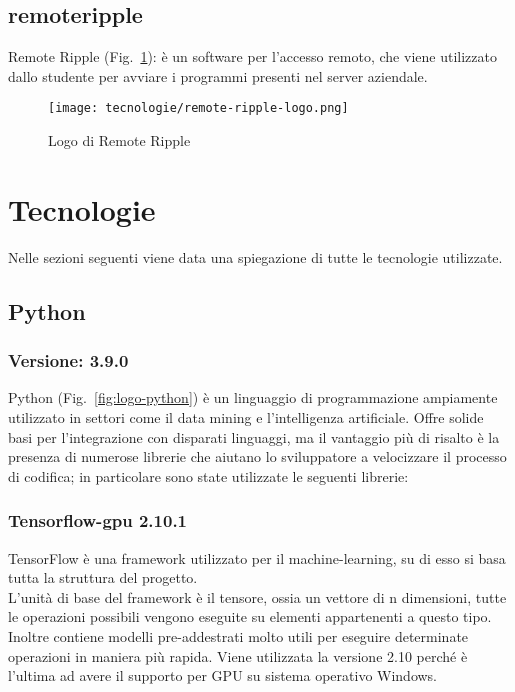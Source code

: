 \subsection{remoteripple}
Remote Ripple (Fig.~\ref{fig:logo-remoteripple}): è un software per l'accesso remoto, che viene utilizzato dallo studente per avviare i programmi presenti nel server aziendale.
    
\begin{figure}[!h] 
    \centering 
    \texttt{[image: tecnologie/remote-ripple-logo.png]} 
    \caption{Logo di Remote Ripple}
    \label{fig:logo-remoteripple}
  \end{figure}


\newpage

\section{Tecnologie}
\label{sec:tecnologie-strumenti}

Nelle sezioni seguenti viene data una spiegazione di tutte le tecnologie utilizzate.

\subsection{Python}

\subsubsection{Versione: 3.9.0}
Python (Fig.~\ref{fig:logo-python}) è un linguaggio di programmazione ampiamente utilizzato in settori come il data mining e l'intelligenza artificiale. 
Offre solide basi per l'integrazione con disparati linguaggi, ma il vantaggio più di risalto è la presenza di numerose librerie che aiutano lo sviluppatore a velocizzare il processo di codifica; in particolare sono state utilizzate le seguenti librerie:

\subsubsection{\label{tec:tensorflow}Tensorflow-gpu 2.10.1}

TensorFlow è una framework utilizzato per il machine-learning, su di esso si basa tutta la struttura del progetto.\\
L'unità di base del framework è il tensore, ossia un vettore di n dimensioni, tutte le operazioni possibili vengono eseguite su elementi appartenenti a questo tipo.
Inoltre contiene modelli pre-addestrati molto utili per eseguire determinate operazioni in maniera più rapida. 
Viene utilizzata la versione 2.10 perché è l'ultima ad avere il supporto per GPU su sistema operativo Windows.

